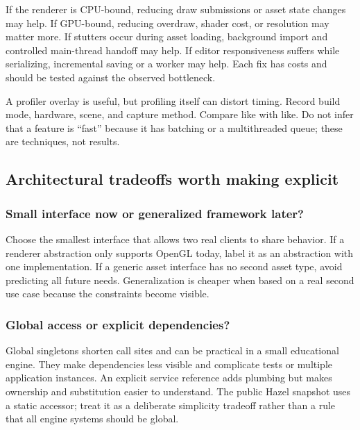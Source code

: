 If the renderer is CPU-bound, reducing draw submissions or asset state changes may help. If GPU-bound, reducing overdraw, shader cost, or resolution may matter more. If stutters occur during asset loading, background import and controlled main-thread handoff may help. If editor responsiveness suffers while serializing, incremental saving or a worker may help. Each fix has costs and should be tested against the observed bottleneck.

A profiler overlay is useful, but profiling itself can distort timing. Record build mode, hardware, scene, and capture method. Compare like with like. Do not infer that a feature is ``fast'' because it has batching or a multithreaded queue; these are techniques, not results.

\subsection{Architectural tradeoffs worth making explicit}\label{06-engine-ii-ch041-architectural-tradeoffs-worth-making-explicit}

\hypertarget{06-engine-ii-ch041-architectural-tradeoffs-worth-making-explicit}{}

\subsubsection{Small interface now or generalized framework later?}\label{06-engine-ii-ch041-small-interface-now-or-generalized-framework-later}

\hypertarget{06-engine-ii-ch041-small-interface-now-or-generalized-framework-later}{}

Choose the smallest interface that allows two real clients to share behavior. If a renderer abstraction only supports OpenGL today, label it as an abstraction with one implementation. If a generic asset interface has no second asset type, avoid predicting all future needs. Generalization is cheaper when based on a real second use case because the constraints become visible.

\subsubsection{Global access or explicit dependencies?}\label{06-engine-ii-ch041-global-access-or-explicit-dependencies}

\hypertarget{06-engine-ii-ch041-global-access-or-explicit-dependencies}{}

Global singletons shorten call sites and can be practical in a small educational engine. They make dependencies less visible and complicate tests or multiple application instances. An explicit service reference adds plumbing but makes ownership and substitution easier to understand. The public Hazel snapshot uses a static  accessor; treat it as a deliberate simplicity tradeoff rather than a rule that all engine systems should be global.

